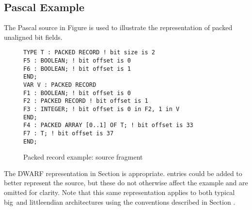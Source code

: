 \subsection{Pascal Example}
\label{app:pascalexample}

The Pascal source in 
Figure 
is used to illustrate the representation of packed unaligned bit
fields.
\begin{figure}[here]
\begin{lstlisting}
TYPE T : PACKED RECORD ! bit size is 2
F5 : BOOLEAN; ! bit offset is 0
F6 : BOOLEAN; ! bit offset is 1
END;
VAR V : PACKED RECORD
F1 : BOOLEAN; ! bit offset is 0
F2 : PACKED RECORD ! bit offset is 1
F3 : INTEGER; ! bit offset is 0 in F2, 1 in V
END;
F4 : PACKED ARRAY [0..1] OF T; ! bit offset is 33
F7 : T; ! bit offset is 37
END;
\end{lstlisting}
\caption{Packed record example: source fragment} \label{fig:packedrecordexamplesourcefragment}
\end{figure}

The DWARF representation in 
Section  
is
appropriate. 
 entries could be added to
better represent the source, but these do not otherwise affect
the example and are omitted for clarity. Note that this same
representation applies to both typical big\dash \ and 
little\dash endian
architectures using the conventions described in 
Section .


